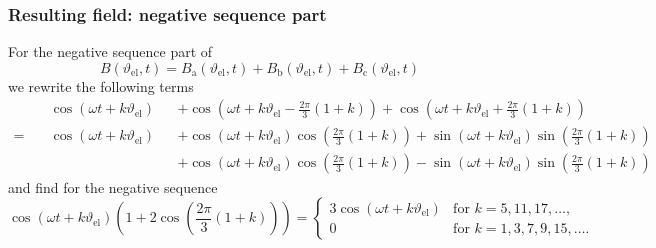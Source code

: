 \begin{frame}
	\frametitle{Resulting field: negative sequence part}
    For the negative sequence part of
    \begin{equation*}
        B(\vartheta_\mathrm{el}, t) = B_\mathrm{a}(\vartheta_\mathrm{el}, t) + B_\mathrm{b}(\vartheta_\mathrm{el}, t) + B_\mathrm{c}(\vartheta_\mathrm{el}, t)
    \end{equation*}
    we rewrite the following terms
    \begin{equation*}
        \begin{alignedat}{2}
        &\cos(\omega t + k \vartheta_\mathrm{el}) &&+ \cos(\omega t + k \vartheta_\mathrm{el} - \frac{2\pi}{3}(1+k)) + \cos(\omega t + k \vartheta_\mathrm{el} + \frac{2\pi}{3}(1+k))\\
         = \quad &\cos(\omega t + k \vartheta_\mathrm{el}) &&+ \cos(\omega t + k \vartheta_\mathrm{el}) \cos(\frac{2\pi}{3}(1+k)) + \sin(\omega t + k \vartheta_\mathrm{el}) \sin(\frac{2\pi}{3}(1+k))\\
         & &&+ \cos(\omega t + k \vartheta_\mathrm{el}) \cos(\frac{2\pi}{3}(1+k)) - \sin(\omega t + k \vartheta_\mathrm{el})\sin(\frac{2\pi}{3}(1+k))
        \end{alignedat}
    \end{equation*}
    and find for the negative sequence
    \begin{equation}
        \cos(\omega t + k \vartheta_\mathrm{el})(1+2\cos(\frac{2\pi}{3}(1+k))) = \begin{cases}
            3 \cos(\omega t + k \vartheta_\mathrm{el}) & \text{for } k=5,11,17,\ldots, \\
            0 & \text{for } k=1, 3, 7,9,15, \ldots.
        \end{cases}
    \end{equation}
\end{frame}

